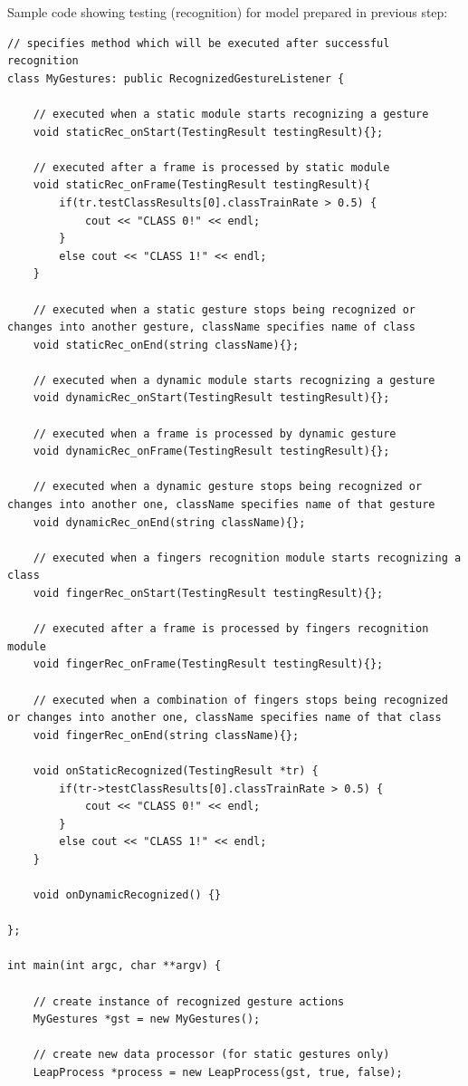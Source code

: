 Sample code showing testing (recognition) for model prepared in previous step:
\begin{lstlisting}
// specifies method which will be executed after successful recognition
class MyGestures: public RecognizedGestureListener {

	// executed when a static module starts recognizing a gesture
	void staticRec_onStart(TestingResult testingResult){};

	// executed after a frame is processed by static module
	void staticRec_onFrame(TestingResult testingResult){
		if(tr.testClassResults[0].classTrainRate > 0.5) {
			cout << "CLASS 0!" << endl;
		}
		else cout << "CLASS 1!" << endl;
	}

	// executed when a static gesture stops being recognized or changes into another gesture, className specifies name of class
	void staticRec_onEnd(string className){};

	// executed when a dynamic module starts recognizing a gesture
	void dynamicRec_onStart(TestingResult testingResult){};

	// executed when a frame is processed by dynamic gesture
	void dynamicRec_onFrame(TestingResult testingResult){};

	// executed when a dynamic gesture stops being recognized or changes into another one, className specifies name of that gesture
	void dynamicRec_onEnd(string className){};

	// executed when a fingers recognition module starts recognizing a class
	void fingerRec_onStart(TestingResult testingResult){};

	// executed after a frame is processed by fingers recognition module
	void fingerRec_onFrame(TestingResult testingResult){};

	// executed when a combination of fingers stops being recognized or changes into another one, className specifies name of that class
	void fingerRec_onEnd(string className){};

	void onStaticRecognized(TestingResult *tr) {
		if(tr->testClassResults[0].classTrainRate > 0.5) {
			cout << "CLASS 0!" << endl;
		}
		else cout << "CLASS 1!" << endl;
	}

	void onDynamicRecognized() {}

};

int main(int argc, char **argv) {

	// create instance of recognized gesture actions
	MyGestures *gst = new MyGestures();

	// create new data processor (for static gestures only)
	LeapProcess *process = new LeapProcess(gst, true, false);


\end{lstlisting}
